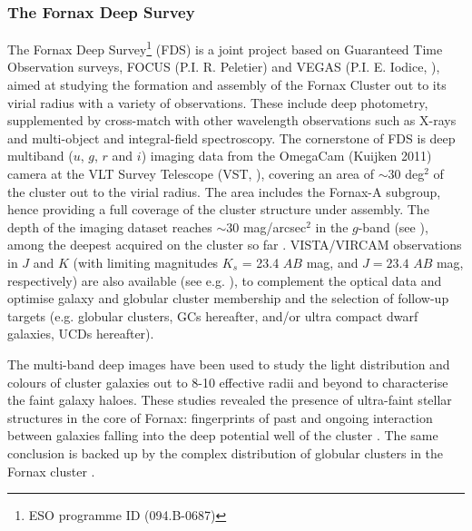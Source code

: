 \documentclass[useAMS,usenatbib]{mn2e}
\begin{document}
\subsubsection{The Fornax Deep Survey}
\label{sec:FDS}

The Fornax Deep Survey\footnote{ESO programme ID (094.B-0687)} (FDS) is a joint 
project based on Guaranteed Time Observation surveys, FOCUS (P.I. R. Peletier) 
and VEGAS (P.I. E. Iodice, \citealt{capaccioli+15}), aimed at studying the 
formation and assembly of the Fornax Cluster out to its virial radius with a 
variety of observations. These include
deep photometry, supplemented by cross-match with other wavelength observations 
such as  X-rays \citep[][e.g.,]{Paolillo02} and multi-object and integral-field 
spectroscopy.
The cornerstone of FDS is deep multiband ($u$, $g$, $r$ and $i$) imaging data 
from the OmegaCam (Kuijken 2011) camera at the VLT Survey Telescope (VST, 
\citealt{schipani+12}), covering an area of $\sim30$ deg$^2$ of the cluster out 
to the virial radius. The area includes the Fornax-A subgroup, hence providing 
a full coverage of the cluster structure under assembly.  The depth of the 
imaging dataset reaches $\sim 30$ mag/arcsec$^2$ in the $g$-band (see \citealt{Iodice16,iodice17}
), among the deepest acquired on the cluster so far \citep{venhola+17}. 
VISTA/VIRCAM observations in $J$ and $K$ (with limiting magnitudes $K_s$ = 23.4 $AB$ mag, and 
$J = 23.4$ $AB$ mag, respectively) are also available (see e.g. \citealt{munoz+15}), to 
complement the optical data and optimise galaxy and globular cluster membership 
and the selection of follow-up targets (e.g. globular clusters, GCs hereafter, 
and/or ultra compact dwarf galaxies, UCDs hereafter). 

The multi-band deep images have been used to study the light distribution and 
colours of cluster galaxies out to 8-10 effective radii and beyond to 
characterise the faint galaxy haloes. These studies revealed the presence of 
ultra-faint stellar structures in the core of Fornax: fingerprints of past and 
ongoing interaction between galaxies falling into the deep potential well of 
the cluster \citep{Iodice16,venhola+17}. The same conclusion is 
backed up by the complex distribution of globular clusters in the Fornax 
cluster \citep{DAbrusco16,cantiello+17}.
\end{document}
